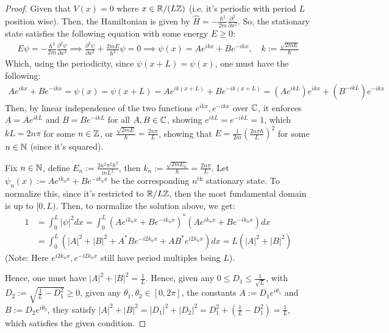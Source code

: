 \documentclass{article}
\begin{document}
\begin{proof}
    Given that $V(x)=0$ where $x \in \mathbb{R}/(L \mathbb{Z})$ (i.e. it's periodic with period $L$ position wise). Then, the Hamiltonian is given by $\hat{H}=-\frac{\hbar^2}{2m}\frac{\partial^2}{\partial x^2}$. So, the stationary state satisfies the following equation with some energy $E\geq 0$:
    \begin{align}
        E\psi = -\frac{\hbar^2}{2m}\frac{\partial^2\psi}{\partial x^2}\implies \frac{\partial^2\psi}{\partial x^2} + \frac{2mE}{\hbar^2}\psi = 0\implies \psi(x)=Ae^{ikx}+Be^{-ikx},\quad k:= \frac{\sqrt{2mE}}{\hbar}
    \end{align}
    Which, using the periodicity, since $\psi(x+L) = \psi(x)$, one must have the following:
    \begin{align}
        Ae^{ikx}+Be^{-ikx}=\psi(x)=\psi(x+L)=Ae^{ik(x+L)}+Be^{-ik(x+L)} = (Ae^{ikL})e^{ikx}+(B^{-ikL})e^{-ikx}
    \end{align}
    Then, by linear independence of the two functions $e^{ikx},e^{-ikx}$ over $\mathbb{C}$, it enforces $A=Ae^{ikL}$ and $B=Be^{-ikL}$ for all $A,B\in\mathbb{C}$, showing $e^{ikL}=e^{-ikL}=1$, which $kL = 2n\pi$ for some $n\in\mathbb{Z}$, or $\frac{\sqrt{2mE}}{\hbar} = \frac{2n\pi}{L}$, showing that $E =\frac{1}{2m}\left(\frac{2n\pi\hbar}{L}\right)^2$ for some $n\in\mathbb{N}$ (since it's squared).

    \hfil

    Fix $n\in\mathbb{N}$, define $E_n:=\frac{2n^2\pi^2\hbar^2}{mL^2}$, then $k_n:=\frac{\sqrt{2mE_n}}{\hbar}=\frac{2n\pi}{L}$. Let $\psi_n(x):=Ae^{ik_nx}+Be^{-ik_nx}$ be the corresponding $n^\text{th}$ stationary state. To normalize this, since it's restricted to $\mathbb{R}/L\mathbb{Z}$, then the most fundamental domain is up to $[0,L)$. Then, to normalize the solution above, we get:
    \begin{align}
        1&=\int_{0}^{L}|\psi|^2dx = \int_{0}^{L}(Ae^{ik_nx}+Be^{-ik_nx})^*(Ae^{ik_nx}+Be^{-ik_nx})dx \\
        &= \int_{0}^{L}\left(|A|^2+|B|^2 + A^*Be^{-i2k_nx}+AB^*e^{i2k_nx}\right)dx = L(|A|^2+|B|^2)
    \end{align}
    (Note: Here $e^{i2k_nx},e^{-i2k_nx}$ still have period multiples being $L$). 

    Hence, one must have $|A|^2+|B|^2=\frac{1}{L}$. Hence, given any $0\leq D_1\leq\frac{1}{\sqrt{L}}$, with $D_2:=\sqrt{\frac{1}{L}-D_1^2}\geq 0$, given any $\theta_1,\theta_2\in[0,2\pi]$, the constants $A:=D_1e^{i\theta_1}$ and $B:=D_2e^{i\theta_2}$, they satisfy $|A|^2+|B|^2=|D_1|^2+|D_2|^2  = D_1^2+(\frac{1}{L}-D_1^2)=\frac{1}{L}$, which satisfies the given condition.


\end{proof}
\end{document}
